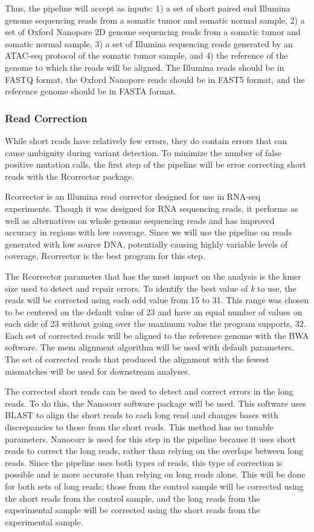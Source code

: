 Thus, the pipeline will accept as inputs: 1) a set of short paired end Illumina genome sequencing reads from a somatic tumor and somatic normal sample, 2) a set of Oxford Nanopore 2D genome sequencing reads from a somatic tumor and somatic normal sample, 3) a set of Illumina sequencing reads generated by an ATAC-seq protocol of the somatic tumor sample, and 4) the reference of the genome to which the reads will be aligned. The Illumina reads should be in FASTQ format, the Oxford Nanopore reads should be in FAST5 format, and the reference genome should be in FASTA format.

\subsubsection{Read Correction}
While short reads have relatively few errors, they do contain errors that can cause ambiguity during variant detection.
To minimize the number of false positive mutation calls, the first step of the pipeline will be error correcting short reads with the Rcorrector package.

Rcorrector is an Illumina read corrector designed for use in RNA-seq experiments. Though it was designed for RNA sequencing reads, it performs as well as alternatives on whole genome sequencing reads and has improved accuracy in regions with low coverage. Since we will use the pipeline on reads generated with low source DNA, potentially causing highly variable levels of coverage, Rcorrector is the best program for this step.

The Rcorrector parameter that has the most impact on the analysis is the kmer size used to detect and repair errors. To identify the best value of \textit{k} to use, the reads will be corrected using each odd value from 15 to 31. This range was chosen to be centered on the default value of 23 and have an equal number of values on each side of 23 without going over the maximum value the program supports, 32. Each set of corrected reads will be aligned to the reference genome with the BWA software. The mem alignment algorithm will be used with default parameters. The set of corrected reads that produced the alignment with the fewest mismatches will be used for downstream analyses.

The corrected short reads can be used to detect and correct errors in the long reads. To do this, the Nanocorr software package will be used. This software uses BLAST to align the short reads to each long read and changes bases with discrepancies to those from the short reads. This method has no tunable parameters. Nanocorr is used for this step in the pipeline because it uses short reads to correct the long reads, rather than relying on the overlaps between long reads. Since the pipeline uses both types of reads, this type of correction is possible and is more accurate than relying on long reads alone. This will be done for both sets of long reads; those from the control sample will be corrected using the short reads from the control sample, and the long reads from the experimental sample will be corrected using the short reads from the experimental sample.

